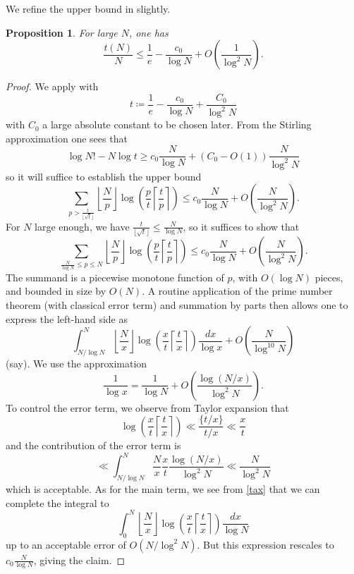 \documentclass[12pt,a4paper,reqno]{amsart}
\numberwithin{equation}{section}
\theoremstyle{plain}
\newtheorem{proposition}[theorem]{Proposition}
\theoremstyle{definition}
\begin{document}
We refine the upper bound in \cite{tao} slightly.

\begin{proposition}  For large $N$, one has
$$ \frac{t(N)}{N} \leq \frac{1}{e} - \frac{c_0}{\log N} + O\left( \frac{1}{\log^2 N} \right).$$
\end{proposition}

\begin{proof}  We apply  with
  $$ t \coloneqq \frac{1}{e} - \frac{c_0}{\log N} + \frac{C_0}{\log^2 N}$$
with $C_0$ a large absolute constant to be chosen later.  From the Stirling approximation one sees that
$$ \log N! - N \log t \geq c_0 \frac{N}{\log N} + (C_0-O(1)) \frac{N}{\log^2 N}$$
so it will suffice to establish the upper bound
$$ \sum_{p > \frac{t}{\lfloor\sqrt{t}\rfloor}} \left\lfloor \frac{N}{p} \right\rfloor \log \left( \frac{p}{t} \left\lceil \frac{t}{p} \right\rceil \right) \leq c_0 \frac{N}{\log N} + O\left( \frac{N}{\log^2 N} \right).$$
For $N$ large enough, we have $\frac{t}{\lfloor\sqrt{t}\rfloor} \leq \frac{N}{\log N}$, so it suffices to show that
$$ \sum_{\frac{N}{\log N} \leq p \leq N} \left\lfloor \frac{N}{p} \right\rfloor \log \left( \frac{p}{t} \left\lceil \frac{t}{p} \right\rceil \right) \leq c_0 \frac{N}{\log N} + O\left( \frac{N}{\log^2 N} \right).$$
The summand is a piecewise monotone function of $p$, with $O(\log N)$ pieces, and bounded in size by $O(N)$.  A routine application of the prime number theorem (with classical error term) and summation by parts then allows one to express the left-hand side as
$$ \int_{N/\log N}^N \left\lfloor \frac{N}{x} \right\rfloor \log \left( \frac{x}{t} \left\lceil \frac{t}{x} \right\rceil \right) \frac{dx}{\log x} + O\left( \frac{N}{\log^{10} N} \right)$$
(say). We use the approximation 
$$\frac{1}{\log x} = \frac{1}{\log N} + O\left( \frac{\log (N/x)}{\log^2 N} \right).$$ 
To control the error term, we observe from Taylor expansion that
\begin{equation}\label{tax} 
\log \left( \frac{x}{t} \left\lceil \frac{t}{x} \right\rceil \right)
\ll \frac{\{ t/x \}}{t/x} \ll \frac{x}{t}
\end{equation}
and the contribution of the error term is
$$ \ll \int_{N/\log N}^N \frac{N}{x} \frac{x}{t} \frac{\log (N/x)}{\log^2 N} \ll \frac{N}{\log^2 N}$$
which is acceptable.  As for the main term, we see from \eqref{tax} that we can complete the integral to
$$ \int_0^N \left\lfloor \frac{N}{x} \right\rfloor \log \left( \frac{x}{t} \left\lceil \frac{t}{x} \right\rceil \right) \frac{dx}{\log N}$$
up to an acceptable error of $O(N/\log^2 N)$.  But this expression rescales to $c_0 \frac{N}{\log N}$, giving the claim.
\end{proof}
\end{document}
